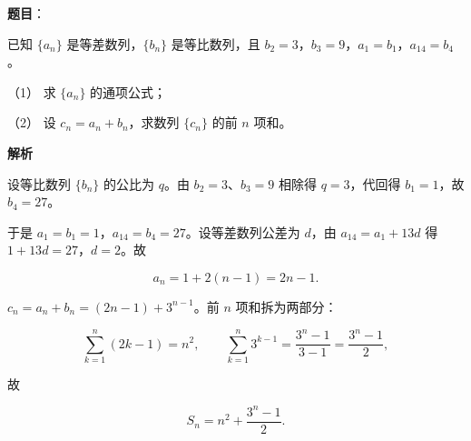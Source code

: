 \begin{answer}

\textbf{题目}：

已知 \(\{a_{n}\}\) 是等差数列，\(\{b_{n}\}\) 是等比数列，且 \(b_{2}=3\)，\(b_{3}=9\)，\(a_{1}=b_{1}\)，\(a_{14}=b_{4}\)。

（1） 求 \(\{a_{n}\}\) 的通项公式；

（2） 设 \(c_{n}=a_{n}+b_{n}\)，求数列 \(\{c_{n}\}\) 的前 \(n\) 项和。

\textbf{解析}


设等比数列 \(\{b_n\}\) 的公比为 \(q\)。由 \(b_2=3\)、\(b_3=9\) 相除得 \(q=3\)，代回得 \(b_1=1\)，故 \(b_4=27\)。

于是 \(a_1=b_1=1\)，\(a_{14}=b_4=27\)。设等差数列公差为 \(d\)，由 \(a_{14}=a_1+13d\) 得 \(1+13d=27\)，\(d=2\)。故

\nopagebreak[4]
\[
a_n=1+2(n-1)=2n-1.
\]


\(c_n=a_n+b_n=(2n-1)+3^{n-1}\)。前 \(n\) 项和拆为两部分：

\nopagebreak[4]
\[
\sum_{k=1}^{n}(2k-1)=n^{2},\qquad
\sum_{k=1}^{n}3^{k-1}=\frac{3^{n}-1}{3-1}=\frac{3^{n}-1}{2},
\]

故

\nopagebreak[4]
\[
S_n=n^{2}+\frac{3^{n}-1}{2}.
\]



\end{answer}
